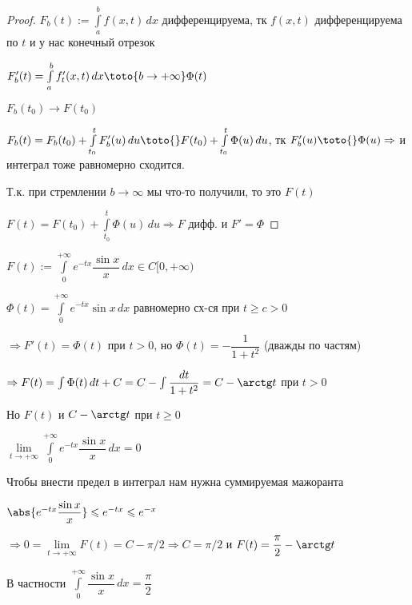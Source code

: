 \begin{proof}\thmslashn
	
	$F_b(t) := \int\limits_{a}^{b} f(x, t)\,dx$ дифференцируема, тк $f(x, t)$ дифференцируема по $t$ и у нас конечный отрезок
	
	$F_b'(t) = \int\limits_{a}^{b} f_t'(x, t)\,dx \toto{b\to +\infty} \Phi(t)$
	
	$F_b(t_0) \to F(t_0)$
	
	$F_b(t) = F_b(t_0) + \int\limits_{t_0}^{t} F_b'(u)\,du \toto{} F(t_0) + \int\limits_{t_0}^{t} \Phi(u)\,du$, тк $F_b'(u) \toto{} \Phi(u) \Rightarrow$ и интеграл тоже равномерно сходится.
	
	Т.к. при стремлении $b \to \infty$ мы что-то получили, то это $F(t)$
	
	$F(t) = F(t_0) + \int\limits_{t_0}^{t} \Phi(u)\,du \Rightarrow F$ дифф. и $F' = \Phi$ 
	
\end{proof}

\begin{example} \thmslashn
	
	$F(t) :=  \int\limits_{0}^{+\infty} e^{-tx} \dfrac{\sin x}{x}\,dx \in C[0, +\infty)$
	
	$\Phi(t) = \int\limits_{0}^{+\infty} e^{-tx} \sin x\,dx$ равномерно сх-ся при $t \geqslant c > 0$
	
	$\Rightarrow F'(t) = \Phi(t)$ при $t > 0$, но $\Phi(t) = -\dfrac{1}{1+t^2}$ (дважды по частям)
	
	$\Rightarrow F(t) = \int \Phi(t) \,dt + C = C - \int \dfrac{dt}{1 + t^2} = C - \arctg t$ при $t > 0$
	
	Но $F(t)$ и $C - \arctg t$ при $t \geqslant 0$
	
	$\lim\limits_{t \to + \infty} \int\limits_{0}^{+\infty} e ^{-tx}\dfrac{\sin x}{x}\,dx = 0$
	
	Чтобы внести предел в интеграл нам нужна суммируемая мажоранта
	
	$\abs{e ^{-tx}\dfrac{\sin x}{x}} \leqslant e^{-tx} \leqslant e^{-x}$
	
	$\Rightarrow 0 = \lim\limits_{t \to + \infty} F(t) = C-\pi/2 \Rightarrow C = \pi/2$ и $F(t) = \dfrac{\pi}{2} - \arctg t$
	
	В частности $\int\limits_{0}^{+\infty} \dfrac{\sin x}{x}\,dx = \dfrac{\pi}{2}$
	
\end{example}
